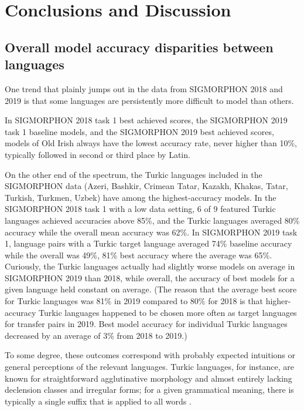 \chapter{Conclusions and Discussion}

\section{Overall model accuracy disparities between languages}

One trend that plainly jumps out in the data from SIGMORPHON 2018 and 2019 is that some languages are persistently more difficult to model than others. 

In SIGMORPHON 2018 task 1 best achieved scores, the SIGMORPHON 2019 task 1 baseline models, and the SIGMORPHON 2019 best achieved scores, models of Old Irish always have the lowest accuracy rate, never higher than 10\%, typically followed in second or third place by Latin. 

On the other end of the spectrum, the Turkic languages included in the SIGMORPHON data (Azeri, Bashkir, Crimean Tatar, Kazakh, Khakas, Tatar, Turkish, Turkmen, Uzbek) have among the highest-accuracy models. In the SIGMORPHON 2018 task 1 with a low data setting, 6 of 9 featured Turkic languages achieved accuracies above 85\%, and the Turkic languages averaged 80\% accuracy while the overall mean accuracy was 62\%. In SIGMORPHON 2019 task 1, language pairs with a Turkic target language averaged 74\% baseline accuracy while the overall was 49\%, 81\% best accuracy where the average was 65\%. Curiously, the Turkic languages actually had slightly worse models on average in SIGMORPHON 2019 than 2018, while overall, the accuracy of best models for a given language held constant on average. (The reason that the average best score for Turkic languages was 81\% in 2019 compared to 80\% for 2018 is that higher-accuracy Turkic languages happened to be chosen more often as target languages for transfer pairs in 2019. Best model accuracy for individual Turkic languages decreased by an average of 3\% from 2018 to 2019.)

To some degree, these outcomes correspond with probably expected intuitions or general perceptions of the relevant languages. Turkic languages, for instance, are known for straightforward agglutinative morphology and almost entirely lacking declension classes and irregular forms; for a given grammatical meaning, there is typically a single suffix that is applied to all words \parencite{Johanson1998}. 

